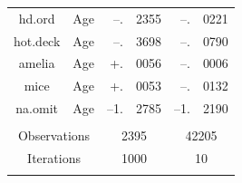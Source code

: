\documentclass[12pt,econ]{sources/authesis}
\begin{document}
\begin{table}[!htbp]
\begin{tabular}{ccr@{}lr@{}l}
 hd.ord & Age & --.&2355 & --.&0221 \\ 
 hot.deck & Age & --.&3698 & --.&0790 \\ 
 amelia & Age & +.&0056 & --.&0006 \\
 mice & Age & +.&0053 & --.&0132 \\
 na.omit & Age & --1.&2785 & --1.&2190 \\
 \hline \\[-1.8ex] 
\multicolumn{2}{c}{Observations} & \multicolumn{2}{c}{2395} & \multicolumn{2}{c}{42205} \\ 
\multicolumn{2}{c}{Iterations} & \multicolumn{2}{c}{1000} & \multicolumn{2}{c}{10} \\ 
\hline \\[-1.8ex] 
 \end{tabular} 
 \end{table}
\end{document}
